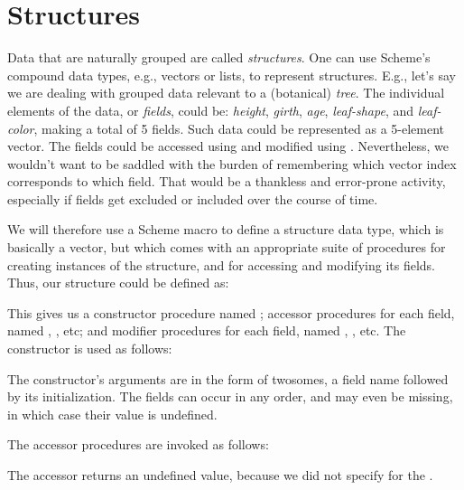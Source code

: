 \chapter{Structures}

Data that are naturally grouped are called {\em
structures}.  One can use Scheme’s compound data types,
e.g., vectors or lists, to represent structures.  E.g.,
let’s say we are dealing with grouped data relevant to
a (botanical) {\em tree}.  The individual elements of
the data, or {\em fields}, could be: {\em height}, {\em
girth}, {\em age}, {\em leaf-shape}, and {\em
leaf-color}, making a total of 5 fields.  Such data
could be represented as a 5-element vector.  The fields
could be accessed using
 and modified using .
Nevertheless, we wouldn’t want to be saddled with the
burden of remembering which vector index corresponds to
which field.  That would be a thankless and error-prone
activity, especially if fields get excluded or included
over the course of time.


We will therefore use a Scheme macro  to
define a structure data type, which is basically a
vector, but which comes with an appropriate suite of
procedures for creating instances of the structure, and
for accessing and modifying its fields.  Thus, our 
structure could be defined as:


This gives us a constructor procedure named
; accessor procedures for each field,
named
, , etc; and modifier
procedures for each field, named ,
, etc.  The constructor is used as
follows:


\n The constructor’s arguments are in the form of
twosomes, a field name followed by its initialization.
The fields can occur in any order, and may even be
missing, in which case their value is undefined.

The accessor procedures are invoked as follows:


\n The  accessor returns an undefined value,
because we did not specify  for the
 .

